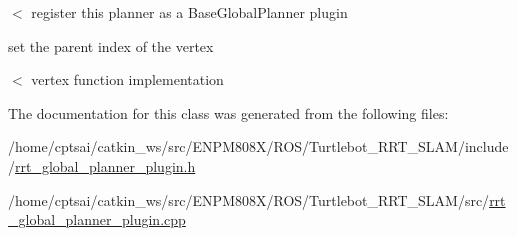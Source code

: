 $<$ register this planner as a Base\+Global\+Planner plugin

set the parent index of the vertex

$<$ vertex function implementation 

The documentation for this class was generated from the following files\+:\begin{DoxyCompactItemize}
\item 
/home/cptsai/catkin\+\_\+ws/src/\+E\+N\+P\+M808\+X/\+R\+O\+S/\+Turtlebot\+\_\+\+R\+R\+T\+\_\+\+S\+L\+A\+M/include/\hyperlink{rrt__global__planner__plugin_8h}{rrt\+\_\+global\+\_\+planner\+\_\+plugin.\+h}\item 
/home/cptsai/catkin\+\_\+ws/src/\+E\+N\+P\+M808\+X/\+R\+O\+S/\+Turtlebot\+\_\+\+R\+R\+T\+\_\+\+S\+L\+A\+M/src/\hyperlink{rrt__global__planner__plugin_8cpp}{rrt\+\_\+global\+\_\+planner\+\_\+plugin.\+cpp}\end{DoxyCompactItemize}
